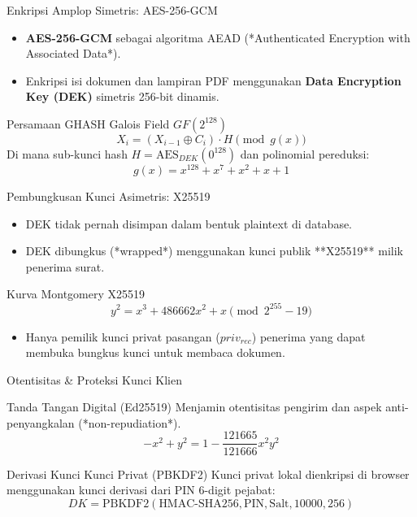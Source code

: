 \documentclass{beamer}
\begin{document}
\begin{frame}{Enkripsi Amplop Simetris: AES-256-GCM}
  \begin{itemize}
    \item \textbf{AES-256-GCM} sebagai algoritma AEAD (*Authenticated Encryption with Associated Data*).
    \item Enkripsi isi dokumen dan lampiran PDF menggunakan \textbf{Data Encryption Key (DEK)} simetris 256-bit dinamis.
  \end{itemize}
  \begin{exampleblock}{Persamaan GHASH Galois Field $GF(2^{128})$}
    $$X_i = (X_{i-1} \oplus C_i) \cdot H \pmod{g(x)}$$
    Di mana sub-kunci hash $H = \text{AES}_{DEK}(0^{128})$ dan polinomial pereduksi:
    $$g(x) = x^{128} + x^7 + x^2 + x + 1$$
  \end{exampleblock}
\end{frame}

\begin{frame}{Pembungkusan Kunci Asimetris: X25519}
  \begin{itemize}
    \item DEK tidak pernah disimpan dalam bentuk plaintext di database.
    \item DEK dibungkus (*wrapped*) menggunakan kunci publik **X25519** milik penerima surat.
  \end{itemize}
  \begin{block}{Kurva Montgomery X25519}
    $$y^2 = x^3 + 486662x^2 + x \pmod{2^{255} - 19}$$
  \end{block}
  \begin{itemize}
    \item Hanya pemilik kunci privat pasangan ($priv_{rec}$) penerima yang dapat membuka bungkus kunci untuk membaca dokumen.
  \end{itemize}
\end{frame}

\begin{frame}{Otentisitas \& Proteksi Kunci Klien}
  \begin{block}{Tanda Tangan Digital (Ed25519)}
    Menjamin otentisitas pengirim dan aspek anti-penyangkalan (*non-repudiation*).
    $$-x^2 + y^2 = 1 - \frac{121665}{121666}x^2y^2$$
  \end{block}
  \begin{block}{Derivasi Kunci Kunci Privat (PBKDF2)}
    Kunci privat lokal dienkripsi di browser menggunakan kunci derivasi dari PIN 6-digit pejabat:
    $$DK = \text{PBKDF2}(\text{HMAC-SHA256}, \text{PIN}, \text{Salt}, 10000, 256)$$
  \end{block}
\end{frame}
\end{document}
